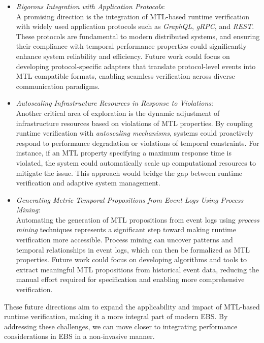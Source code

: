 \documentclass[twocolumn]{article}
\begin{document}
\begin{itemize}
	\item \emph{Rigorous Integration with Application Protocols}: \\
	      A promising direction is the integration of MTL-based runtime verification with widely used application protocols such as \emph{GraphQL}, \emph{gRPC}, and \emph{REST}. These protocols are fundamental to modern distributed systems, and ensuring their compliance with temporal performance properties could significantly enhance system reliability and efficiency. Future work could focus on developing protocol-specific adapters that translate protocol-level events into MTL-compatible formats, enabling seamless verification across diverse communication paradigms.

	\item \emph{Autoscaling Infrastructure Resources in Response to Violations}: \\
	      Another critical area of exploration is the dynamic adjustment of infrastructure resources based on violations of MTL properties. By coupling runtime verification with \emph{autoscaling mechanisms}, systems could proactively respond to performance degradation or violations of temporal constraints. For instance, if an MTL property specifying a maximum response time is violated, the system could automatically scale up computational resources to mitigate the issue. This approach would bridge the gap between runtime verification and adaptive system management.

	\item \emph{Generating Metric Temporal Propositions from Event Logs Using Process Mining}: \\
	      Automating the generation of MTL propositions from event logs using \emph{process mining} techniques represents a significant step toward making runtime verification more accessible. Process mining can uncover patterns and temporal relationships in event logs, which can then be formalized as MTL properties. Future work could focus on developing algorithms and tools to extract meaningful MTL propositions from historical event data, reducing the manual effort required for specification and enabling more comprehensive verification.
\end{itemize}

These future directions aim to expand the applicability and impact of MTL-based runtime verification, making it a more integral part of modern EBS. By addressing these challenges, we can move closer to integrating performance considerations in EBS in a non-invasive manner.
\end{document}
